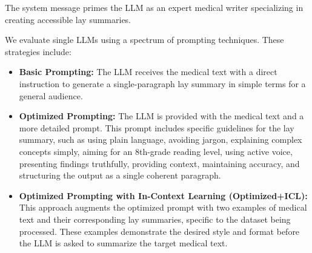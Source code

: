 \documentclass{article}
\begin{document}
The system message primes the LLM as an expert medical writer specializing in creating accessible lay summaries.

We evaluate single LLMs using a spectrum of prompting techniques. These strategies include:
\begin{itemize}
    \item \textbf{Basic Prompting:} The LLM receives the medical text with a direct instruction to generate a single-paragraph lay summary in simple terms for a general audience.
    \item \textbf{Optimized Prompting:} The LLM is provided with the medical text and a more detailed prompt. This prompt includes specific guidelines for the lay summary, such as using plain language, avoiding jargon, explaining complex concepts simply, aiming for an 8th-grade reading level, using active voice, presenting findings truthfully, providing context, maintaining accuracy, and structuring the output as a single coherent paragraph.
    \item \textbf{Optimized Prompting with In-Context Learning (Optimized+ICL):} This approach augments the optimized prompt with two examples of medical text and their corresponding lay summaries, specific to the dataset being processed. These examples demonstrate the desired style and format before the LLM is asked to summarize the target medical text.
\end{itemize}
\end{document}
